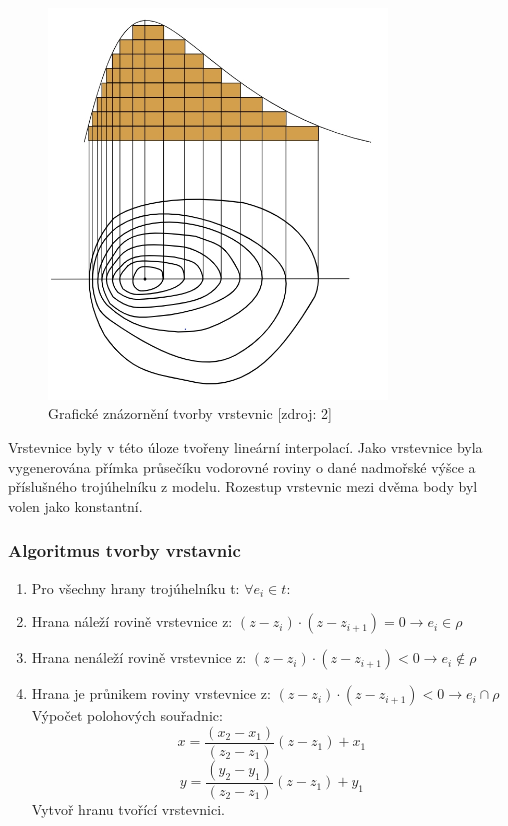 \documentclass[a4paper, 12pt]{article}
\begin{document}
\begin{figure}[h!]
	\centering
	\includegraphics[width=9cm]{vrstevnice.jpg}
	\caption{Grafické znázornění tvorby vrstevnic [zdroj: 2]}
\end{figure}

Vrstevnice byly v této úloze tvořeny lineární interpolací. Jako vrstevnice byla vygenerována přímka průsečíku vodorovné roviny o dané nadmořské výšce a příslušného trojúhelníku z modelu. Rozestup vrstevnic mezi dvěma body byl volen jako konstantní. 

\subsubsection{Algoritmus tvorby vrstavnic}
\begin{enumerate}
\item Pro všechny hrany trojúhelníku t: $ \forall e_i \in t: $
\item Hrana náleží rovině vrstevnice z: $ (z - z_i) \cdot (z - z_{i+1}) = 0 \rightarrow e_i \in \rho $
\item Hrana nenáleží rovině vrstevnice z: $ (z - z_i) \cdot (z - z_{i+1}) < 0 \rightarrow e_i \not \in \rho $
\item Hrana je průnikem roviny vrstevnice z: $ (z - z_i) \cdot (z - z_{i+1}) < 0 \rightarrow e_i \cap \rho $
\subitem Výpočet polohových souřadnic: 
$$  x = \frac{(x_2 - x_1)}{(z_2 - z_1)} (z - z_1) + x_1 $$ 
$$  y = \frac{(y_2 - y_1)}{(z_2 - z_1)} (z - z_1) + y_1 $$ 
\subitem Vytvoř hranu tvořící vrstevnici.
\end{enumerate}
\end{document}
